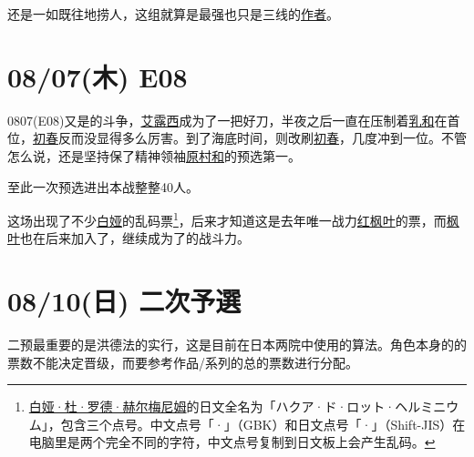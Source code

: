 还是一如既往地捞人，这组就算是最强也只是三线的\uline{作者}。

\section{08/07(木) E08}


0807(E08)又是的斗争，\uline{艾露西}成为了一把好刀，半夜之后一直在压制着\uline{乳和}在首位，\uline{初春}反而没显得多么厉害。到了海底时间，则改刷\uline{初春}，几度冲到一位。不管怎么说，还是坚持保了精神领袖\uline{原村和}的预选第一。

至此一次预选进出本战整整40人。

这场出现了不少\uline{白娅}的乱码票\footnote{\uline{白娅·杜·罗德·赫尔梅尼姆}的日文全名为「{\mincho ハクア·ド·ロット·ヘルミニウム}」，包含三个点号。中文点号「·」（GBK）和日文点号「{\mincho ·}」（Shift-JIS）在电脑里是两个完全不同的字符，中文点号复制到日文板上会产生乱码。}，后来才知道这是去年唯一战力\uline{红枫叶}的票，而\uline{枫叶}也在后来加入了，继续成为了的战斗力。

\section{08/10(日) 二次予選}

二预最重要的是洪德法的实行，这是目前在日本两院中使用的算法。角色本身的的票数不能决定晋级，而要参考作品/系列的总的票数进行分配。


